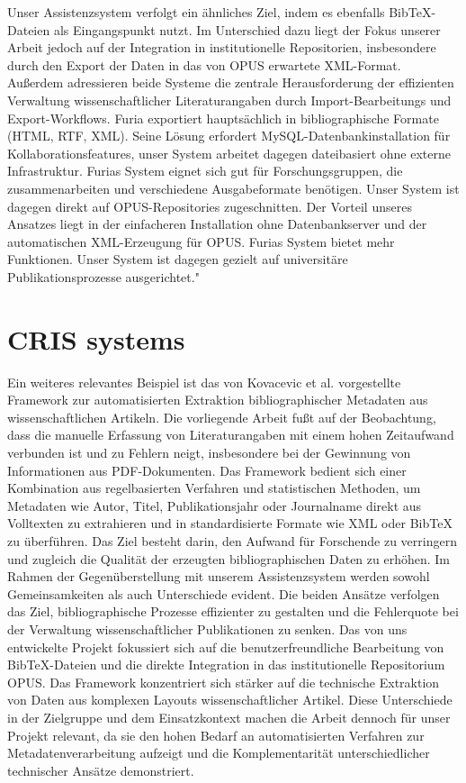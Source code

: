 \noindent Unser Assistenzsystem verfolgt ein ähnliches Ziel, indem es ebenfalls 
Bib\TeX{}-Dateien als Eingangspunkt nutzt. Im Unterschied dazu liegt der 
Fokus unserer Arbeit jedoch auf der Integration in institutionelle 
Repositorien, insbesondere durch den Export der Daten in das von OPUS 
erwartete XML-Format. Außerdem adressieren beide Systeme die zentrale Herausforderung der
effizienten Verwaltung wissenschaftlicher Literaturangaben durch Import-Bearbeitungs und Export-Workflows.
Furia exportiert  hauptsächlich in bibliographische Formate (HTML, RTF, XML).
Seine Lösung erfordert MySQL-Datenbankinstallation für Kollaborationsfeatures, unser System arbeitet dagegen dateibasiert
ohne externe Infrastruktur. Furias System eignet sich gut für Forschungsgruppen, die zusammenarbeiten und verschiedene Ausgabeformate benötigen.
Unser System ist dagegen direkt auf OPUS-Repositories zugeschnitten. Der Vorteil unseres Ansatzes liegt in der einfacheren
Installation ohne Datenbankserver und der automatischen XML-Erzeugung für OPUS. Furias System bietet mehr Funktionen. 
Unser System ist dagegen  gezielt auf universitäre Publikationsprozesse ausgerichtet."

\section{CRIS systems}
Ein weiteres relevantes Beispiel ist das von Kovacevic et al. 
\cite{kovavcevic2011automatic} vorgestellte Framework zur automatisierten 
Extraktion bibliographischer Metadaten aus wissenschaftlichen Artikeln. 
Die vorliegende Arbeit fußt auf der Beobachtung, dass die manuelle 
Erfassung von Literaturangaben mit einem hohen Zeitaufwand verbunden 
ist und zu Fehlern neigt, insbesondere bei der Gewinnung von 
Informationen aus PDF-Dokumenten. Das Framework bedient sich 
einer Kombination aus regelbasierten Verfahren und statistischen 
Methoden, um Metadaten wie Autor, Titel, Publikationsjahr oder 
Journalname direkt aus Volltexten zu extrahieren und in standardisierte 
Formate wie XML oder BibTeX zu überführen. Das Ziel besteht darin, den 
Aufwand für Forschende zu verringern und zugleich die Qualität der 
erzeugten bibliographischen Daten zu erhöhen. Im Rahmen der 
Gegenüberstellung mit unserem Assistenzsystem werden sowohl 
Gemeinsamkeiten als auch Unterschiede evident. Die beiden Ansätze 
verfolgen das Ziel, bibliographische Prozesse effizienter zu gestalten 
und die Fehlerquote bei der Verwaltung wissenschaftlicher Publikationen 
zu senken. Das von uns entwickelte Projekt fokussiert sich auf die 
benutzerfreundliche Bearbeitung von BibTeX-Dateien und die direkte 
Integration in das institutionelle Repositorium OPUS. Das Framework 
konzentriert sich stärker auf die technische Extraktion von Daten aus 
komplexen Layouts wissenschaftlicher Artikel. Diese Unterschiede in der 
Zielgruppe und dem Einsatzkontext machen die Arbeit dennoch für unser 
Projekt relevant, da sie den hohen Bedarf an automatisierten Verfahren 
zur Metadatenverarbeitung aufzeigt und die Komplementarität unterschiedlicher 
technischer Ansätze demonstriert.